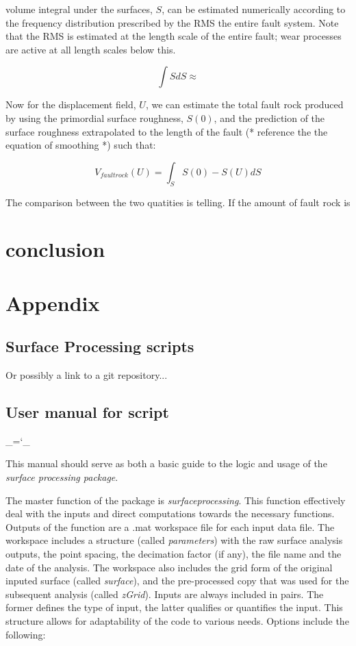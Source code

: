 \documentclass[12pt,a4paper]{article}
\begin{document}
volume integral under the surfaces, $S$, can be estimated numerically according to the frequency distribution prescribed by the RMS the  entire fault system. Note that the RMS is estimated at the length scale of the entire fault; wear processes are active at all length scales below this.

\begin{equation}
	\int S dS \approx 
\end{equation}

Now for the displacement field, $U$, we can estimate the total fault rock produced by using the primordial surface roughness, $S(0)$, and the prediction of the surface roughness extrapolated to the length of the fault (* reference the the equation of smoothing *) such that:

\begin{equation}
	V_{fault rock}(U) = \int_S S(0)-S(U)dS
\end{equation}

The comparison between the two quatities is telling. If the amount of fault rock is

\section{conclusion}

\section{Appendix}

\subsection{Surface Processing scripts}

Or possibly a link to a git repository...

\subsection{User manual for script}

\chardef\_=`_

This manual should serve as both a basic guide to the logic and usage of the \textit{surface processing package}. 

The master function of the package is \textit{surfaceprocessing}. This function effectively deal with the inputs and direct computations towards the necessary functions. Outputs of the function are a .mat workspace file for each input data file. The workspace includes a structure (called \textit{parameters}) with the raw surface analysis outputs, the point spacing, the decimation factor (if any), the file name and the date of the analysis. The workspace also includes the grid form of the original inputed surface (called \textit{surface}), and the pre-processed copy that was used for the subsequent analysis (called \textit{zGrid}).  Inputs are always included in pairs. The former defines the type of input, the latter qualifies or quantifies the input. This structure allows for adaptability of the code to various needs. Options include the following:
\end{document}
